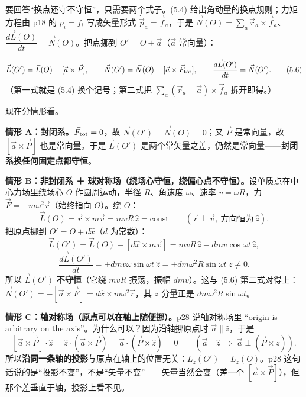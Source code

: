 \documentclass[11pt]{ctexart}
\begin{document}
要回答“换点还守不守恒”，只需要两个式子。(5.4) 给出角动量的换点规则；力矩方程由 p18 的 $\dot p_i=f_i$ 写成矢量形式 $\dot{\vec p}_a=\vec f_a$，于是 $\vec N(O)=\sum_a\vec r_a\times\vec f_a$、$\dfrac{d\vec L(O)}{dt}=\vec N(O)$。把点挪到 $O'=O+\vec a$（$\vec a$ 常向量）：

\[
\vec L(O')=\vec L(O)-[\vec a\times\vec P],\qquad
\vec N(O')=\vec N(O)-[\vec a\times\vec F_{\rm tot}],\qquad
\frac{d\vec L(O')}{dt}=\vec N(O') . \tag{5.6}
\]
（第一式就是 (5.4) 换个记号；第二式把 $\sum_a(\vec r_a-\vec a)\times\vec f_a$ 拆开即得。）

现在分情形看。

\textbf{情形 A：封闭系。}$\vec F_{\rm tot}=0$，故 $\vec N(O')=\vec N(O)=0$；又 $\vec P$ 是常向量，故 $[\vec a\times\vec P]$ 也是常向量。于是 $\vec L(O')$ 是两个常矢量之差，仍然是常向量——\textbf{封闭系换任何固定点都守恒}。

\textbf{情形 B：非封闭系 ＋ 球对称场（绕场心守恒，绕偏心点不守恒）。}设单质点在中心力场里绕场心 $O$ 作圆周运动，半径 $R$、角速度 $\omega$、速率 $v=\omega R$，力 $\vec F=-m\omega^2\vec r$（始终指向 $O$）。绕 $O$：
\[
\vec L(O)=\vec r\times m\vec v=mvR\,\hat z=\text{const}\qquad(\vec r\perp\vec v,\ \text{方向恒为}\ \hat z).
\]
把原点挪到 $O'=O+d\hat x$（$d$ 为常数）：
\[
\vec L(O')=\vec L(O)-[d\hat x\times m\vec v]=mvR\,\hat z-dmv\cos\omega t\,\hat z ,
\]
\[
\frac{d\vec L(O')}{dt}=+dmv\omega\sin\omega t\ \hat z=+dm\omega^2R\sin\omega t\ \hat z\ne0 .
\]
所以 $\vec L(O')$ \textbf{不守恒}（它绕 $mvR$ 振荡，振幅 $dmv$）。这与 (5.6) 第二式对得上：$\vec N(O')=-[\vec a\times\vec F]=d\hat x\times m\omega^2\vec r$，其 $z$ 分量正是 $dm\omega^2R\sin\omega t$。


\textbf{情形 C：轴对称场（原点可以在轴上随便挪）。}p28 说轴对称场里 “origin is arbitrary on the axis”。为什么可以？因为沿轴挪原点时 $\vec a\parallel\hat z$，于是
\[
[\vec a\times\vec P]\cdot\hat z=\hat z\cdot(\vec a\times\vec P)=\vec a\cdot(\vec P\times\hat z)=0
\qquad(\vec a\parallel\hat z\ \Rightarrow\ \vec a\perp(\vec P\times\hat z)).
\]
所以\textbf{沿同一条轴的投影}与原点在轴上的位置无关：$L_z(O')=L_z(O)$。p28 这句话说的是“投影不变”，不是“矢量不变”——矢量当然会变（差一个 $[\vec a\times\vec P]$），但那个差垂直于轴，投影上看不见。

\end{document}
